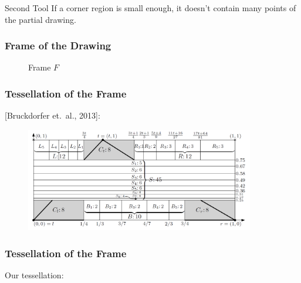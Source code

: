 \documentclass{beamer}
\begin{document}
\begin{frame}
\begin{block}{Second Tool}
If a corner region is small enough, it doesn’t contain many points of the
partial drawing.
\end{block}

\begin{figure}
\centering
\resizebox{6cm}{!}{%

}
\end{figure}
\end{frame}

\begin{frame}
\frametitle{Frame of the Drawing}
\begin{figure}
\centering
\resizebox{8cm}{!}{%

}
\caption{Frame $F$}
\end{figure}
\end{frame}

\begin{frame}
\frametitle{Tessellation of the Frame}
[Bruckdorfer et.\ al., 2013]:
\begin{figure}
\centering
\includegraphics[width=10cm]{./figures/bruckdorfer-tessellation.png}
\end{figure}
\end{frame}

\begin{frame}
\frametitle{Tessellation of the Frame}
Our tessellation:
\begin{figure}[!ht]
\begin{center}
\resizebox{6cm}{!}{%

}
\end{center}
\end{figure}
\end{frame}
\end{document}
